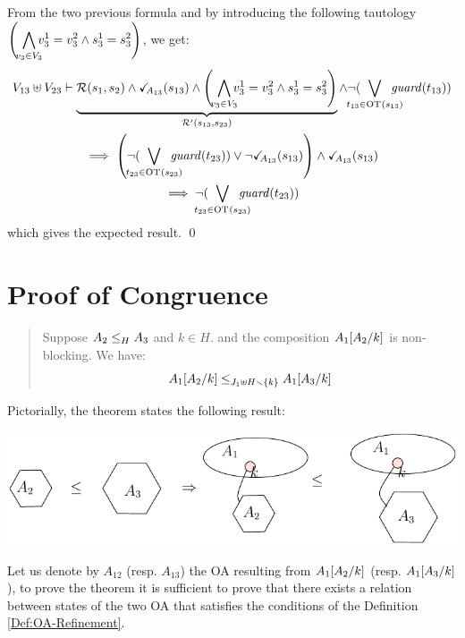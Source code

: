 \documentclass[runningheads]{llncs}
\begin{document}
\begin{enumerate}
From the two previous formula and by introducing the following tautology\\ $ \mpar{\,\,\displaystyle \bigwedge_\subbox{v_3\in V_3} v^1_3=v^2_3\wedge s^1_3 = s^2_3}$, we get: 
\begin{multline*}
V_{13} \uplus V_{23}  \vdash  \underbrace{\mathcal{R}\mpar{s_1, s_2} \wedge \reach{A_{13}}(s_{13}) \land \mpar{\,\,\bigwedge_\subbox{v_3\in V_3}  v^1_3=v^2_3 \wedge s^1_3=s^2_3}}_{\mathcal{R}^{\prime}(s_{13},s_{23})} \wedge \neg(\bigvee_\subbox{t_{13} \in \fOT{s_{13}}} \fguard{t_{13}})   \\ \implies \left(\neg(\bigvee_\subbox{t_{23} \in \fOT{s_{23}}} \fguard{t_{23}}) \lor \neg{\reach{A_{13}}(s_{13}) }\right) \land \reach{A_{13}}(s_{13})\\
\implies \neg(\bigvee_\subbox{t_{23} \in \fOT{s_{23}}} \fguard{t_{23}})
\end{multline*}
which gives the expected result. \qed
\end{enumerate}






\section{Proof of Congruence}
\begin{quote}
Suppose $\wrel{A_2}{A_3}{H}$ and  $k \in H$.  and the composition $A_1\subst{A_2}{k}$ is non-blocking. We have: \[\wrel{A_1\subst{A_2}{k}}{A_1\subst{A_3}{k}}{J_1 \uplus H \setminus \mbrc{k}}\]
\end{quote}
\smallskip
Pictorially, the theorem states the following result:

\begin{center}
\includegraphics[scale=0.7]{Figures/Thm1intuition}
\end{center}
\proof
Let us denote by $A_{12}$ (resp. $A_{13}$) the OA resulting from $A_1\subst{A_2}{k}$ (resp. $A_1\subst{A_3}{k}$),  to prove the theorem it is sufficient to prove that there exists a relation between states of the two OA that satisfies the conditions of the Definition \ref{Def:OA-Refinement}. 
\end{document}
